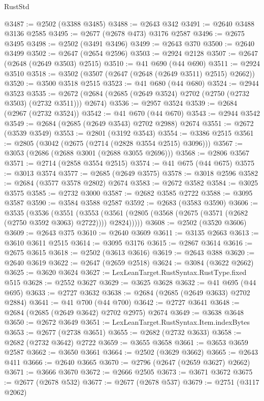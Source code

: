 \begin{lexlean}{RustStd}
\begin{coremodule}
@3487 := @2502 (@3388 @3485)
@3488 := @2643 @342
@3491 := @2640 @3488 @3136 @2585
@3495 := @2677 (@2678 @473) @3176 @2587
@3496 := @2675 @3495
@3498 := @2502 (@3491 @3496)
@3499 := @2643 @370
@3500 := @2640 @3499
@3502 := @2647 (@2654 @2596)
@3503 := @2924 @2128
@3507 := @2647 (@2648 (@2649 @3503) @2515)
@3510 := @41 @690 (@44 @690)
@3511 := @2924 @3510
@3518 := @3502 (@3507 (@2647 (@2648 (@2649 @3511) @2515) @2662))
@3520 := @3500 @3518 @2515
@3523 := @41 @680 (@44 @680)
@3524 := @2944 @3523
@3535 := @2672 (@2684 (@2685 (@2649 @3524) @2702 (@2750 (@2732 @3503) (@2732 @3511))) @2674)
@3536 := @2957 @3524
@3539 := @2684 (@2967 (@2732 @3524))
@3542 := @41 @670 (@44 @670)
@3543 := @2944 @3542
@3549 := @2684 (@2685 (@2649 @3543) @2702 @2988) @2674
@3551 := @2672 (@3539 @3549)
@3553 := @2801 (@3192 @3543)
@3554 := @3386 @2515
@3561 := @2805 (@3042 (@2675 (@2714 (@2828 @3554 @2515) @3096)))
@3567 := @3053 (@2686 (@2688 @3001 (@2688 @3055 @2696)))
@3568 := @2806 @3567
@3571 := @2714 (@2858 @3554 @2515)
@3574 := @41 @675 (@44 @675)
@3575 := @3013 @3574
@3577 := @2685 (@2649 @3575)
@3578 := @3018 @2596
@3582 := @2684 (@3577 @3578 @2802) @2674
@3583 := @2672 @3582
@3584 := @3025 @3575
@3585 := @2732 @3000
@3587 := @2682 @3585 @2722
@3588 := @3095 @3587
@3590 := @3584 @3588 @2587
@3592 := @2683 (@3583 @3590)
@3606 := @3535
    (@3536
      (@3551
        (@3553 (@3561 (@2805 (@3568 (@2675 (@3571 (@2682 (@2750 @3592 @3063) @2722)))) @2824)))))
@3608 := @2502 (@3520 @3606)
@3609 := @2643 @375
@3610 := @2640 @3609
@3611 := @3135 @2663
@3613 := @3610 @3611 @2515
@3614 := @3095 @3176
@3615 := @2867 @3614
@3616 := @2675 @3615
@3618 := @2502 (@3613 @3616)
@3619 := @2643 @388
@3620 := @2640 @3619
@3622 := @2647 (@2659 @2518)
@3624 := @3084 (@3622 @2662)
@3625 := @3620 @3624
@3627 := LexLeanTarget.RustSyntax.RustType.fixed @515
@3628 := @2552 @3627
@3629 := @3625 @3628
@3632 := @41 @695 (@44 @695)
@3633 := @2727 @3632
@3638 := @2684 (@2685 (@2649 @3633) @2702 @2884)
@3641 := @41 @700 (@44 @700)
@3642 := @2727 @3641
@3648 := @2684 (@2685 (@2649 @3642) @2702 @2975) @2674
@3649 := @3638 @3648
@3650 := @2672 @3649
@3651 := LexLeanTarget.RustSyntax.Item.indexBytes
@3653 := @2677 (@2738 @3651)
@3655 := @2682 (@2732 @3633)
@3658 := @2682 (@2732 @3642) @2722
@3659 := @3655 @3658
@3661 := @3653 @3659 @2587
@3662 := @3650 @3661
@3664 := @2502 (@3629 @3662)
@3665 := @2643 @411
@3666 := @2640 @3665
@3670 := @2796 (@2647 (@2659 @3627) @2662)
@3671 := @3666 @3670
@3672 := @2666 @2505
@3673 := @3671 @3672
@3675 := @2677 (@2678 @532)
@3677 := @2677 (@2678 @537)
@3679 := @2751 (@3117 @2062)

\end{coremodule}
\end{lexlean}
